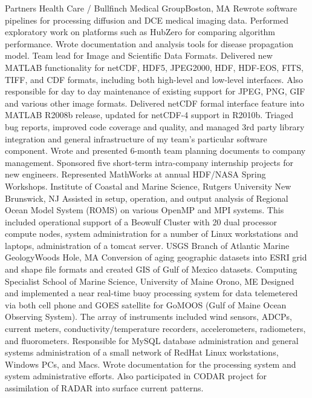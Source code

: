 \documentclass[11pt]{moderncv}  %
\begin{document}
{
	Partners Health Care / Bullfinch Medical Group}{Boston, MA}{}{
    Rewrote software pipelines for processing diffusion and DCE medical
    imaging data.  Performed exploratory work on platforms such as
    HubZero  for comparing algorithm performance. Wrote documentation
    and analysis tools for disease propagation model.
}
{   
Team lead for Image and Scientific Data Formats.  Delivered new MATLAB functionality for netCDF, HDF5, JPEG2000, HDF, HDF-EOS, FITS, TIFF, and CDF formats, including both high-level and low-level interfaces.  Also responsible for day to day maintenance of existing support for JPEG, PNG, GIF and various other image formats.  Delivered netCDF formal interface feature into MATLAB R2008b release, updated for netCDF-4 support in R2010b. Triaged bug reports, improved code coverage and quality, and managed 3rd party library integration and general infrastructure of my team's particular software component.  Wrote and presented 6-month team planning documents to company management.  Sponsored five short-term intra-company internship projects for new engineers.  Represented MathWorks at annual HDF/NASA Spring Workshops.
}
{
	Institute of Coastal and Marine Science, Rutgers University}
    {New Brunswick, NJ}{} {
Assisted in setup,  operation, and output analysis  of Regional Ocean Model System (ROMS) on various OpenMP and MPI systems.  This included operational support of a Beowulf Cluster with 20 dual processor compute nodes, system administration for a number of Linux workstations and laptops, administration of a tomcat server.
}
{
	USGS Branch of Atlantic Marine Geology}{Woods Hole, MA}{}{
    Conversion of aging geographic datasets into ESRI grid and shape
    file formats and created GIS of Gulf of Mexico datasets.
}
{Computing Specialist}
{School of Marine Science, University of Maine}
{Orono, ME}{}
{
    Designed and implemented a near real-time buoy processing system
    for data telemetered via both cell phone and GOES satellite for
    GoMOOS (Gulf of Maine Ocean Observing System).   The array of
    instruments included wind sensors, ADCPs, current meters,
    conductivity/temperature recorders, accelerometers, radiometers,
    and fluorometers.   Responsible for MySQL database administration
    and general systems administration of a small network of RedHat
    Linux workstations, Windows PCs, and Macs.   Wrote documentation
    for the processing system and system administrative efforts.
    Also participated in CODAR project for assimilation of RADAR
    into surface current patterns.
}
\end{document}
